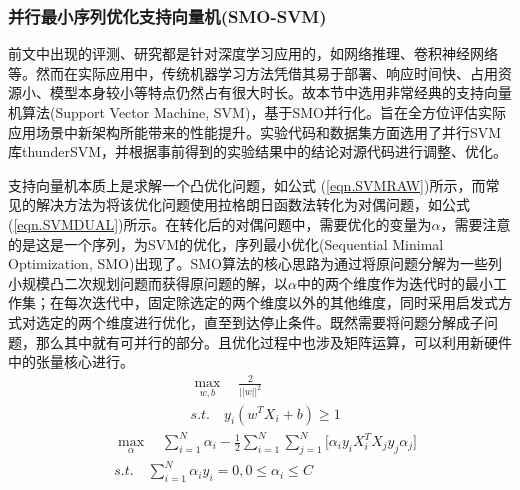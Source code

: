 \subsubsection{并行最小序列优化支持向量机(SMO-SVM)}
\par 前文中出现的评测、研究都是针对深度学习应用的，如网络推理、卷积神经网络等。然而在实际应用中，传统机器学习方法凭借其易于部署、响应时间快、占用资源小、模型本身较小等特点仍然占有很大时长。故本节中选用非常经典的支持向量机算法(Support Vector Machine, SVM)，基于SMO并行化。旨在全方位评估实际应用场景中新架构所能带来的性能提升。实验代码和数据集方面选用了并行SVM库thunderSVM，并根据事前得到的实验结果中的结论对源代码进行调整、优化。
\par 支持向量机本质上是求解一个凸优化问题，如公式 (\ref{eqn.SVMRAW})所示，而常见的解决方法为将该优化问题使用拉格朗日函数法转化为对偶问题，如公式 (\ref{eqn.SVMDUAL})所示。在转化后的对偶问题中，需要优化的变量为$ \alpha $，需要注意的是这是一个序列，为SVM的优化，序列最小优化(Sequential Minimal Optimization, SMO)出现了\cite{SMO}。SMO算法的核心思路为通过将原问题分解为一些列小规模凸二次规划问题而获得原问题的解，以$ \alpha $中的两个维度作为迭代时的最小工作集；在每次迭代中，固定除选定的两个维度以外的其他维度，同时采用启发式方式对选定的两个维度进行优化，直至到达停止条件。既然需要将问题分解成子问题，那么其中就有可并行的部分。且优化过程中也涉及矩阵运算，可以利用新硬件中的张量核心进行。
\begin{equation}
\begin{aligned}
&\max_{w, b} \quad \frac{2}{||w||^2} \\
&s.t.\quad y_{i}(w^{T}X_{i}+b) \geq 1
\end{aligned}
\label{eqn.SVMRAW}
\end{equation}
\begin{equation}
\begin{aligned}
&\max_{\alpha} \quad \sum_{i=1}^{N}\alpha_{i} - \frac{1}{2}\sum_{i=1}^{N}\sum_{j=1}^{N}\lbrack \alpha_{i}y_{i}X_{i}^{T}X_{j}y_{j}\alpha_{j} \rbrack \\
&s.t.\quad \sum_{i=1}^{N}\alpha_{i}y_{i}=0, 0 \leq \alpha_{i} \leq C
\end{aligned}
\label{eqn.SVMDUAL}
\end{equation}
